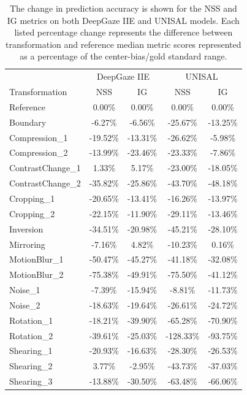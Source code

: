\documentclass[sigconf]{acmart}
\begin{document}
\begin{table}
	\caption{The change in prediction accuracy is shown for the NSS and IG metrics on both DeepGaze IIE
	and UNISAL models. Each listed percentage change represents the difference between transformation
	and reference median metric scores represented as a percentage of the center-bias/gold standard
	range.}
	\label{tab:results}
	\begin{small}
		\begin{tabular}{lcccc}%
			\toprule
			& \multicolumn{2}{c}{DeepGaze IIE} & \multicolumn{2}{c}{UNISAL} \\
			Transformation & NSS & IG & NSS & IG \\
			\midrule
			Reference & 0.00\% & 0.00\% & 0.00\% & 0.00\% \\
			Boundary & -6.27\% & -6.56\% & -25.67\% & -13.25\% \\
			Compression\_1 & -19.52\% & -13.31\% & -26.62\% & -5.98\% \\
			Compression\_2 & -13.99\% & -23.46\% & -23.33\% & -7.86\% \\
			ContrastChange\_1 & 1.33\% & 5.17\% & -23.00\% & -18.05\% \\
			ContrastChange\_2 & -35.82\% & -25.86\% & -43.70\% & -48.18\% \\
			Cropping\_1 & -20.65\% & -13.41\% & -16.26\% & -13.97\% \\
			Cropping\_2 & -22.15\% & -11.90\% & -29.11\% & -13.46\% \\
			Inversion & -34.51\% & -20.98\% & -45.21\% & -28.10\% \\
			Mirroring & -7.16\% & 4.82\% & -10.23\% & 0.16\% \\
			MotionBlur\_1 & -50.47\% & -45.27\% & -41.18\% & -32.08\% \\
			MotionBlur\_2 & -75.38\% & -49.91\% & -75.50\% & -41.12\% \\
			Noise\_1 & -7.39\% & -15.94\% & -8.81\% & -11.73\% \\
			Noise\_2 & -18.63\% & -19.64\% & -26.61\% & -24.72\% \\
			Rotation\_1 & -18.21\% & -39.90\% & -65.28\% & -70.90\% \\
			Rotation\_2 & -39.61\% & -25.03\% & -128.33\% & -93.75\% \\
			Shearing\_1 & -20.93\% & -16.63\% & -28.30\% & -26.53\% \\
			Shearing\_2 & 3.77\% & -2.95\% & -43.73\% & -37.03\% \\
			Shearing\_3 & -13.88\% & -30.50\% & -63.48\% & -66.06\% \\
			\bottomrule
		\end{tabular}
	\end{small}
\end{table}
\end{document}
